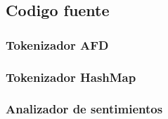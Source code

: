 \subsection{Codigo fuente}

\subsubsection{Tokenizador AFD}
\subsubsection{Tokenizador HashMap}
\subsubsection{Analizador de sentimientos}
